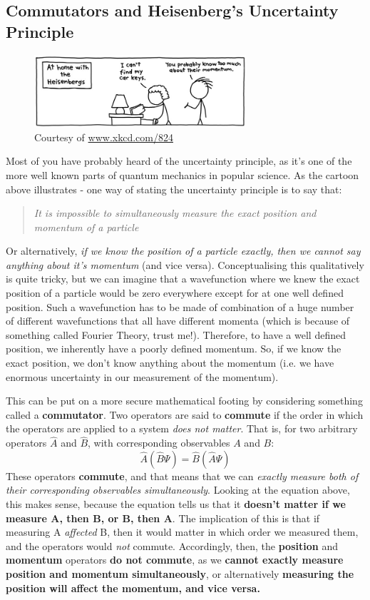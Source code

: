 \documentclass{memoir}[11pt,oneside,a4paper,openany]
\newcommand{\wf}{\ensuremath{\Psi}\xspace}
\begin{document}
\subsection{Commutators and Heisenberg's Uncertainty Principle}
\begin{figure}[h!]
	\centering
	\includegraphics[width=0.7\textwidth]{keys-heis.jpg}
	\caption{Courtesy of \url{www.xkcd.com/824}}
\end{figure}
Most of you have probably heard of the uncertainty principle, as it's one of the more well known parts of quantum mechanics in popular science. As the cartoon above illustrates - one way of stating the uncertainty principle is to say that:
\begin{quote}
	\textit{It is impossible to simultaneously measure the exact position and momentum of a particle}
\end{quote}
Or alternatively, \emph{if we know the position of a particle exactly, then we cannot say anything about it's momentum} (and vice versa). Conceptualising this qualitatively is quite tricky, but we can imagine that a wavefunction where we knew the exact position of a particle would be zero everywhere except for at one well defined position. Such a wavefunction has to be made of combination of a huge number of different wavefunctions that all have different momenta (which is because of something called Fourier Theory, trust me!). Therefore, to have a well defined position, we inherently have a poorly defined momentum. So, if we know the exact position, we don't know anything about the momentum (i.e. we have enormous uncertainty in our measurement of the momentum).

This can be put on a more secure mathematical footing by considering something called a \textbf{commutator}. Two operators are said to \textbf{commute} if the order in which the operators are applied to a system \emph{does not matter}. That is, for two arbitrary operators $\hat{A}$ and $\hat{B}$, with corresponding observables $A$ and $B$:
\begin{equation}
	\hat{A}(\hat{B}\wf) = \hat{B}(\hat{A}\wf)
\end{equation}
These operators \textbf{commute}, and that means that we can \emph{exactly measure both of their corresponding observables simultaneously}. Looking at the equation above, this makes sense, because the equation tells us that it \textbf{doesn't matter if we measure A, then B, or B, then A}. The implication of this is that if measuring A \emph{affected} B, then it would matter in which order we measured them, and the operators would \emph{not} commute. Accordingly, then, the \textbf{position} and \textbf{momentum} operators \textbf{do not commute}, as we \textbf{cannot exactly measure position and momentum simultaneously}, or alternatively \textbf{measuring the position will affect the momentum, and vice versa.} 
\end{document}
